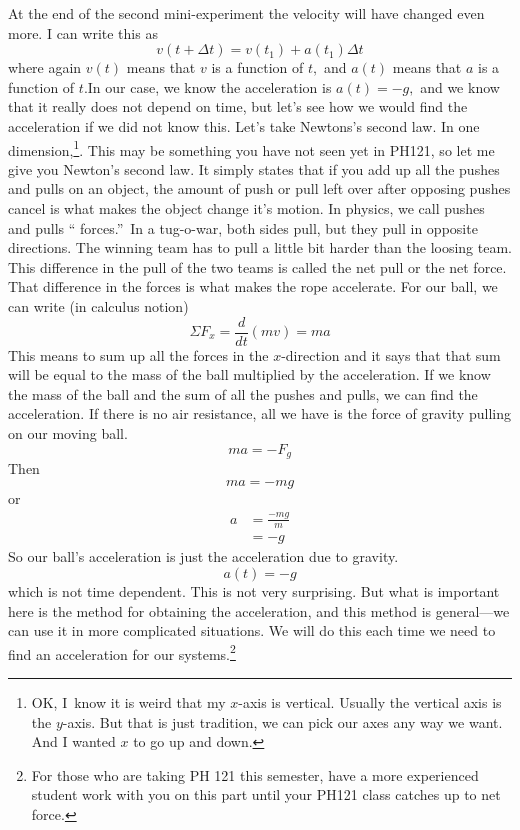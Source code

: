 \documentclass{book}
\begin{document}
At the end of the second mini-experiment the velocity will have changed even
more. I can write this as
\[
v(t+\Delta t)=v(t_{1})+a(t_{1})\Delta t
\]
where again $v(t)$ means that $v$ is a function of $t,$ and $a\left(
t\right)  $ means that $a$ is a function of $t.$In our case, we know the
acceleration is $a\left(  t\right)  =-g,$ and we know that it really does not
depend on time, but let's see how we would find the acceleration if we did not
know this. Let's take Newtons's second law. In one dimension,\footnote{OK,
I\ know it is weird that my $x$-axis is vertical. Usually the vertical axis is
the $y$-axis. But that is just tradition, we can pick our axes any way we
want. And I wanted $x$ to go up and down.}. This may be something you have not
seen yet in PH121, so let me give you Newton's second law. It simply states
that if you add up all the pushes and pulls on an object, the amount of push
or pull left over after opposing pushes cancel is what makes the object change
it's motion. In physics, we call pushes and pulls \textquotedblleft
forces.\textquotedblright\ In a tug-o-war, both sides pull, but they pull in
opposite directions. The winning team has to pull a little bit harder than the
loosing team. This difference in the pull of the two teams is called the net
pull or the net force. That difference in the forces is what makes the rope
accelerate. For our ball, we can write (in calculus notion) \[
\Sigma F_{x}=\frac{d}{dt}\left(  mv\right)  =ma
\]
This means to sum up all the forces in the $x$-direction and it says that that
sum will be equal to the mass of the ball multiplied by the acceleration. If
we know the mass of the ball and the sum of all the pushes and pulls, we can
find the acceleration. If there is no air resistance, all we have is the force
of gravity pulling on our moving ball.
\[
ma=-F_{g}
\]
Then
\[
ma=-mg
\]
or \begin{align*}
a  & =\frac{-mg}{m}\\
& =-g
\end{align*}
So our ball's acceleration is just the acceleration due to gravity.
\[
a\left(  t\right)  =-g
\]
which is not time dependent. This is not very surprising. But what is
important here is the method for obtaining the acceleration, and this method
is general---we can use it in more complicated situations. We will do this
each time we need to find an acceleration for our systems.\footnote{For those
who are taking PH 121 this semester, have a more experienced student work with
you on this part until your PH121 class catches up to net force.}
\end{document}
